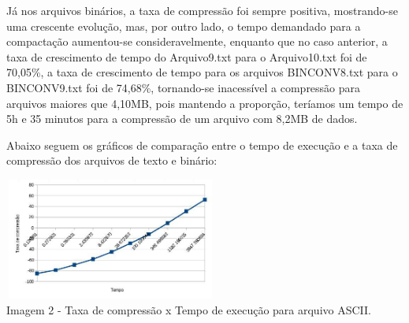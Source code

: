 \documentclass[
	article,			
	11pt,				
	oneside,			
	a4paper,			
	english,			
	brazil,				
	sumario=tradicional
	]{abntex2}
\begin{document}
\begin{table}[h!]
  \begin{center}
    \label{tab:table5}
    \caption{Taxa de compressão e tempo de execução para arquivos binários.}
  \end{center}
\end{table}

Já nos arquivos binários, a taxa de compressão foi sempre positiva, mostrando-se uma crescente evolução, mas, por outro lado, o tempo demandado para a compactação aumentou-se consideravelmente, enquanto que no caso anterior, a taxa de crescimento de tempo do Arquivo9.txt para o Arquivo10.txt foi de 70,05\%, a taxa de crescimento de tempo para os arquivos BINCONV8.txt para o BINCONV9.txt foi de 74,68\%, tornando-se inacessível a compressão para arquivos maiores que 4,10MB, pois mantendo a proporção, teríamos um tempo de 5h e 35 minutos para a compressão de um arquivo com 8,2MB de dados.

Abaixo seguem os gráficos de comparação entre o tempo de execução e a taxa de compressão dos arquivos de texto e binário:

\begin{center}
	\includegraphics[width=7cm,height=4cm]{ASCII.jpg}\\
	Imagem 2 - Taxa de compressão x Tempo de execução para arquivo ASCII.
\end{center}
\end{document}
